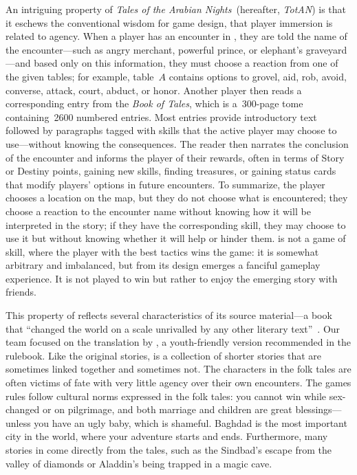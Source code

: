 \documentclass[a4paper]{article}
\begin{document}
An intriguing property of \textit{Tales of the Arabian Nights}~(hereafter, \textit{TotAN}) is that it eschews the conventional wisdom for game design,
that player immersion is related to agency.
When a player has an encounter in \totan, they are told the name of the
encounter---such as angry merchant,  powerful prince, or
elephant's graveyard---and based only on this information,
they must choose a reaction from one of the given tables; for example, 
table~$A$ contains options to grovel, aid, rob, avoid, converse,
attack, court, abduct, or honor.
Another player then reads a corresponding entry from 
the \textit{Book of Tales}, which is a~300-page
tome containing~2600 numbered entries.
Most entries provide introductory text followed by paragraphs
tagged with skills that the active player may choose to use---without
knowing the consequences. The reader then narrates the conclusion of the
encounter and informs the player of their rewards, often in terms of
Story or Destiny points, gaining new skills, finding treasures, or
gaining status cards that modify players' options in future encounters.
To summarize, the player chooses a location on the map, but they do not 
choose what is encountered; they choose a reaction to the encounter name
without knowing how it will be interpreted in the story;
if they have the corresponding skill, they may choose to use it but
without knowing whether it will help or hinder them.
\totan{} is not a game of skill, where the player with the best tactics
wins the game: it is somewhat arbitrary and imbalanced, but from its
design emerges a fanciful gameplay experience. It is not played to win
but rather to enjoy the emerging story with friends.

This property of \totan{} reflects several characteristics
of its source material---a book that ``changed the world on a scale
unrivalled by any other literary text''~\citep[p.1]{Makdisi2008}.
Our team focused on the translation by \citep{Neil1994}, a youth-friendly
version recommended in the \totan{} rulebook.
Like the original stories, \totan{} is a collection of shorter stories
that are sometimes linked together and sometimes not.
The characters in the folk tales are often victims of fate with
very little agency over their own encounters. The games rules follow
cultural norms expressed in the folk tales:
you cannot win while sex-changed or on pilgrimage, and both marriage
and children are great blessings---unless you have an ugly baby,
which is shameful.
Baghdad is the most important city in the world, where your adventure starts
and ends.
Furthermore, many stories in \totan{} come directly from the tales,
such as the Sindbad's escape from the valley of diamonds or Aladdin's
being trapped in a magic cave. 
\end{document}
